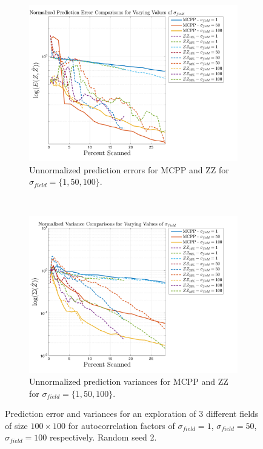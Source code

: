 \begin{figure}[htb!]
    \centering
    \begin{subfigure}[t]{0.75\textwidth}
        \centering
        \includegraphics[width=\linewidth]{figures/results/errors_30p_100x100_sf_all_seed_2_app_0.png}
        \captionsetup{skip=0.20\baselineskip,size=footnotesize}
        \caption{Unnormalized prediction errors for MCPP and ZZ for $\sigma_{field} = \{1, 50, 100\}$.}
    \end{subfigure}%
    \\
    \begin{subfigure}[t]{0.75\textwidth}
        \centering
        \includegraphics[width=\linewidth]{figures/results/variances_30p_100x100_sf_all_seed_2_app_0.png}
        \captionsetup{skip=0.20\baselineskip,size=footnotesize}
        \caption{Unnormalized prediction variances for MCPP and ZZ for $\sigma_{field} = \{1, 50, 100\}$.}
    \end{subfigure}%
    \ssp
    \captionsetup{skip=0.20\baselineskip}
    \caption{Prediction error and variances for an exploration of $3$ different fields of size $100 \times 100$ for autocorrelation factors of $\sigma_{field} = 1$, $\sigma_{field} = 50$, $\sigma_{field} = 100$ respectively. Random seed 2.}
    \label{fig:multaccomp_s2}
\end{figure}
